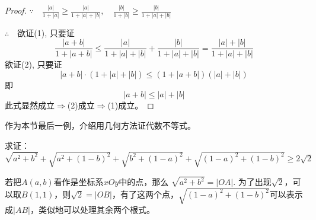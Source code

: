 \begin{proof}
$\because\quad \frac{|a|}{1+|a|}\ge \frac{|a|}{1+|a|+|b|},\quad \frac{|b|}{1+|b|}\ge \frac{|b|}{1+|a|+|b|}$

$\therefore\quad $欲证(1), 只要证
\begin{equation}
\frac{|a+b|}{1+|a+b|}\le \frac{|a|}{1+|a|+|b|}+\frac{|b|}{1+|a|+|b|}=\frac{|a|+|b|}{1+|a|+|b|} \tag{2}
\end{equation}
欲证(2), 只要证
\begin{equation}
    |a+b|\cdot (1+|a|+|b|)\le (1+|a+b|)(|a|+|b|)\tag{3}
\end{equation}
即
\[|a+b|\le |a|+|b|\]
此式显然成立$\Longrightarrow$(2)成立$\Longrightarrow$(1)成立。
\end{proof}

作为本节最后一例，介绍用几何方法证代数不等式。

\begin{example}
求证：$\sqrt{a^2+b^2}+\sqrt{a^2+(1-b)^2}+\sqrt{b^2+(1-a)^2}+\sqrt{(1-a)^2+(1-b)^2}\ge 2\sqrt{2}$
\end{example}

\begin{analyze}
    若把$A(a,b)$看作是坐标系$xOy$中的点，那么
$\sqrt{a^2+b^2}=|OA|$. 为了出现$\sqrt{2}$，可以取$B(1,1)$，则$\sqrt{2}=|OB|$，有了这两个点，$\sqrt{(1-a)^2+(1-b)^2}$可以表示成$|AB|$，类似地可以处理其余两个根式。
\end{analyze}

